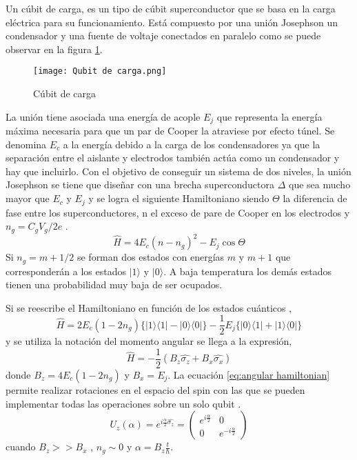 \documentclass[12pt]{article}
\begin{document}
Un cúbit de carga, es un tipo de cúbit superconductor que se basa en la carga eléctrica para su funcionamiento. Está compuesto por una unión Josephson un condensador y una fuente de voltaje conectados en paralelo como se puede observar en la figura \ref{fig:Cúbit de carga}.\\
\begin{figure}[h]
  \centering
  \texttt{[image: Qubit de carga.png]}
  \caption{Cúbit de carga \cite{gu_microwave_2017}}
  \label{fig:Cúbit de carga}
\end{figure}
 
La unión tiene asociada una energía de acople $E_j$ que representa la energía máxima necesaria para que un par de Cooper la atraviese por efecto túnel. Se denomina $E_c$ a la energía debido a la carga de los condensadores ya que la separación entre el aislante y electrodos también actúa como un condensador y hay que incluirlo. Con el objetivo de conseguir un sistema de dos niveles, la unión Josephson se tiene que diseñar con una brecha superconductora $\Delta$ que sea mucho mayor que $E_c$ y $E_j$ y se logra el siguiente Hamiltoniano siendo $\Theta$ la diferencia de fase entre los superconductores, n el exceso de pare de Cooper en los electrodos y $n_g = C_gV_g/2e$ \cite{leonardo_qubits_2004}.
\begin{equation} \label{eq:hamiltonian}
  \widehat{H} = 4E_c(n-n_g)^2 - E_j\cos\Theta
\end{equation}
Si $n_g = m+1/2$ se forman dos estados con energías $m$ y $m + 1$ que corresponderán a los estados $|1\rangle$ y $|0\rangle$. A baja temperatura los demás estados tienen una probabilidad muy baja de ser ocupados.

Si se reescribe el Hamiltoniano en función de los estados cuánticos \cite{gu_microwave_2017} ,
\begin{equation} \label{eq:ket hamiltonian}
  \widehat{H}  = 2E_c(1-2n_g)\{|1\rangle\langle1| - |0\rangle\langle0|\} - \frac{1}{2}E_j\{|0\rangle\langle1| + |1\rangle\langle0|\}
\end{equation}
 y se utiliza la notación del momento angular se llega a la expresión,
 \begin{equation} \label{eq:angular hamiltonian}
  \widehat{H}  = - \frac{1}{2}(B_z\hat{\sigma_z}  + B_x\hat{\sigma_x})
\end{equation}
donde $B_z = 4E_c(1-2n_g)$ y $B_x=E_j$.
La ecuación \ref*{eq:angular hamiltonian} permite realizar rotaciones en el espacio del spin con las que se pueden implementar todas las operaciones sobre un solo qubit \cite{leonardo_qubits_2004}. 
\begin{equation}\label{eq:1 rotation}
  U_z(\alpha )= e^{i\frac{\alpha }{2}\hat{\sigma_z}} = 
  \begin{pmatrix}
    e^{i\frac{\alpha}{2}} & 0 \\
    0 & e^{-i\frac{\alpha}{2}}
  \end{pmatrix}
\end{equation}
cuando $B_z >> B_x$ ,  $n_g\sim 0$ y $\alpha = B_z \frac{t}{\hbar}$.
\end{document}
